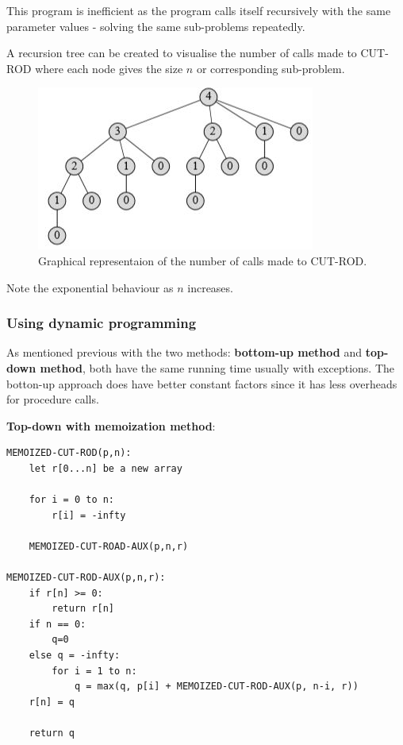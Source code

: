 \documentclass[10pt,a4paper]{article}
\begin{document}
This program is inefficient as the program calls itself recursively with the same parameter values -
solving the same sub-problems repeatedly. \par 

A recursion tree can be created to visualise the number of calls made to CUT-ROD where each node
gives the size $n$ or corresponding sub-problem.

\begin{figure} [h]
    \centering
    \includegraphics[]{Recursion_tree.JPG}
    \caption{Graphical representaion of the number of calls made to CUT-ROD.}
\end{figure}

Note the exponential behaviour as $n$ increases.

\pagebreak

\subsubsection{Using dynamic programming}

As mentioned previous with the two methods: \textbf{bottom-up method} and \textbf{top-down method},
both have the same running time usually with exceptions. The botton-up approach does have better
constant factors since it has less overheads for procedure calls. \par 

\textbf{Top-down with memoization method}:
\begin{lstlisting}
MEMOIZED-CUT-ROD(p,n):
    let r[0...n] be a new array

    for i = 0 to n:
        r[i] = -infty 
    
    MEMOIZED-CUT-ROAD-AUX(p,n,r)

MEMOIZED-CUT-ROD-AUX(p,n,r):
    if r[n] >= 0:
        return r[n]
    if n == 0:
        q=0
    else q = -infty:
        for i = 1 to n:
            q = max(q, p[i] + MEMOIZED-CUT-ROD-AUX(p, n-i, r))
    r[n] = q

    return q
\end{lstlisting}
\end{document}
